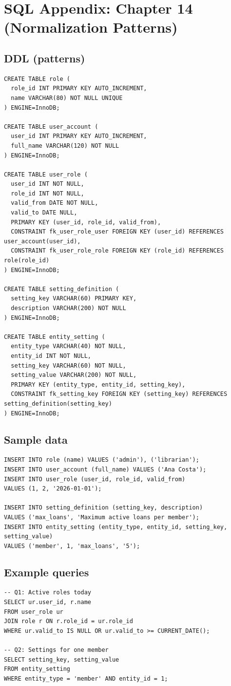 \chapter{SQL Appendix: Chapter 14 (Normalization Patterns)}

\section{DDL (patterns)}
\begin{verbatim}
CREATE TABLE role (
  role_id INT PRIMARY KEY AUTO_INCREMENT,
  name VARCHAR(80) NOT NULL UNIQUE
) ENGINE=InnoDB;

CREATE TABLE user_account (
  user_id INT PRIMARY KEY AUTO_INCREMENT,
  full_name VARCHAR(120) NOT NULL
) ENGINE=InnoDB;

CREATE TABLE user_role (
  user_id INT NOT NULL,
  role_id INT NOT NULL,
  valid_from DATE NOT NULL,
  valid_to DATE NULL,
  PRIMARY KEY (user_id, role_id, valid_from),
  CONSTRAINT fk_user_role_user FOREIGN KEY (user_id) REFERENCES user_account(user_id),
  CONSTRAINT fk_user_role_role FOREIGN KEY (role_id) REFERENCES role(role_id)
) ENGINE=InnoDB;

CREATE TABLE setting_definition (
  setting_key VARCHAR(60) PRIMARY KEY,
  description VARCHAR(200) NOT NULL
) ENGINE=InnoDB;

CREATE TABLE entity_setting (
  entity_type VARCHAR(40) NOT NULL,
  entity_id INT NOT NULL,
  setting_key VARCHAR(60) NOT NULL,
  setting_value VARCHAR(200) NOT NULL,
  PRIMARY KEY (entity_type, entity_id, setting_key),
  CONSTRAINT fk_setting_key FOREIGN KEY (setting_key) REFERENCES setting_definition(setting_key)
) ENGINE=InnoDB;
\end{verbatim}

\section{Sample data}
\begin{verbatim}
INSERT INTO role (name) VALUES ('admin'), ('librarian');
INSERT INTO user_account (full_name) VALUES ('Ana Costa');
INSERT INTO user_role (user_id, role_id, valid_from)
VALUES (1, 2, '2026-01-01');

INSERT INTO setting_definition (setting_key, description)
VALUES ('max_loans', 'Maximum active loans per member');
INSERT INTO entity_setting (entity_type, entity_id, setting_key, setting_value)
VALUES ('member', 1, 'max_loans', '5');
\end{verbatim}

\section{Example queries}
\begin{verbatim}
-- Q1: Active roles today
SELECT ur.user_id, r.name
FROM user_role ur
JOIN role r ON r.role_id = ur.role_id
WHERE ur.valid_to IS NULL OR ur.valid_to >= CURRENT_DATE();

-- Q2: Settings for one member
SELECT setting_key, setting_value
FROM entity_setting
WHERE entity_type = 'member' AND entity_id = 1;
\end{verbatim}
